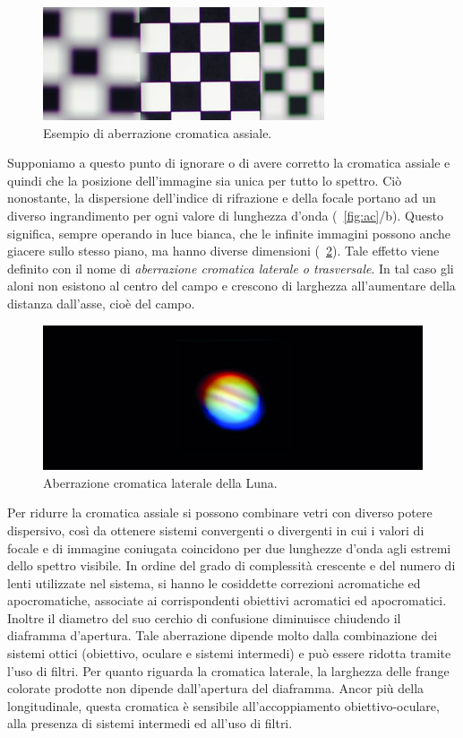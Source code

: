\begin{figure}
 \centering
 \includegraphics[scale=.65]{img/CAP2aca.jpg}
 \caption{\small{Esempio di aberrazione cromatica assiale.}}
 \label{fig:aca}
\end{figure}

Supponiamo a questo punto di ignorare o di avere corretto la cromatica assiale e quindi che la posizione dell'immagine sia unica per tutto lo spettro.
Ciò nonostante, la dispersione dell'indice di rifrazione e della focale portano ad un diverso ingrandimento per ogni valore di lunghezza d'onda (\figurename~\ref{fig:ac}/b). 
Questo significa, sempre operando in luce bianca, che le infinite immagini possono anche giacere sullo stesso piano, ma hanno diverse dimensioni (\figurename~\ref{fig:acl}). 
Tale effetto viene definito con il nome di \textit{aberrazione cromatica laterale o trasversale}.
In tal caso gli aloni non esistono al centro del campo e crescono di larghezza all'aumentare della distanza dall'asse, cioè del campo.

\begin{figure}
 \centering
 \includegraphics[scale=.30]{img/CAP2acl.jpg}
 \caption{\small{Aberrazione cromatica laterale della Luna.}}
 \label{fig:acl}
\end{figure}

Per ridurre la cromatica assiale si possono combinare vetri con diverso potere dispersivo, così da ottenere sistemi convergenti o divergenti in cui i valori di focale e di immagine coniugata coincidono per due lunghezze d'onda agli estremi dello spettro visibile. 
In ordine del grado di complessità crescente e del numero di lenti utilizzate nel sistema, si hanno le cosiddette correzioni acromatiche ed apocromatiche, associate ai corrispondenti obiettivi acromatici ed apocromatici. 
Inoltre il diametro del suo cerchio di confusione diminuisce chiudendo il diaframma d'apertura. 
Tale aberrazione dipende molto dalla combinazione dei sistemi ottici (obiettivo, oculare e sistemi intermedi) e può essere ridotta tramite l'uso di filtri. 
Per quanto riguarda la cromatica laterale, la larghezza delle frange colorate prodotte non dipende dall'apertura del diaframma.
Ancor più della longitudinale, questa cromatica è sensibile all'accoppiamento obiettivo-oculare, alla presenza di sistemi intermedi ed all'uso di filtri.


